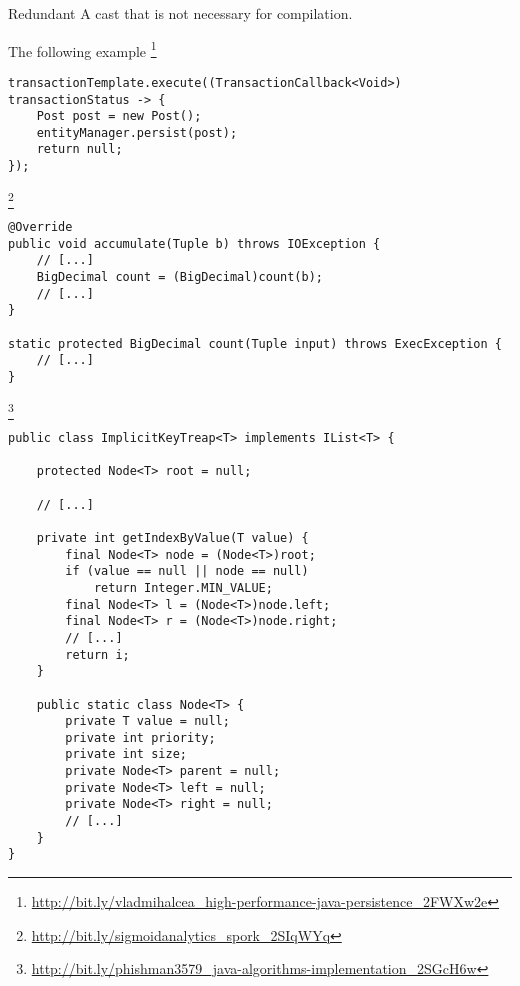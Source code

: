 \begin{pattern}{Redundant}
A cast that is not necessary for compilation.

\instances{}
The following example%
\footnote{\url{http://bit.ly/vladmihalcea_high-performance-java-persistence_2FWXw2e}}

\begin{verbatim}
transactionTemplate.execute((TransactionCallback<Void>) transactionStatus -> {
    Post post = new Post();
    entityManager.persist(post);
    return null;
});
\end{verbatim}

\footnote{\url{http://bit.ly/sigmoidanalytics_spork_2SIqWYq}}

\begin{verbatim}
@Override
public void accumulate(Tuple b) throws IOException {
    // [...]
    BigDecimal count = (BigDecimal)count(b);
    // [...]
}

static protected BigDecimal count(Tuple input) throws ExecException {
    // [...]
}
\end{verbatim}

\footnote{\url{http://bit.ly/phishman3579_java-algorithms-implementation_2SGcH6w}}

\begin{verbatim}
public class ImplicitKeyTreap<T> implements IList<T> {

    protected Node<T> root = null;

    // [...]

    private int getIndexByValue(T value) {
        final Node<T> node = (Node<T>)root;
        if (value == null || node == null)
            return Integer.MIN_VALUE;
        final Node<T> l = (Node<T>)node.left;
        final Node<T> r = (Node<T>)node.right;
        // [...]
        return i;
    }

    public static class Node<T> {
        private T value = null;
        private int priority;
        private int size;
        private Node<T> parent = null;
        private Node<T> left = null;
        private Node<T> right = null;
        // [...]
    }
}
\end{verbatim}


\end{pattern}
